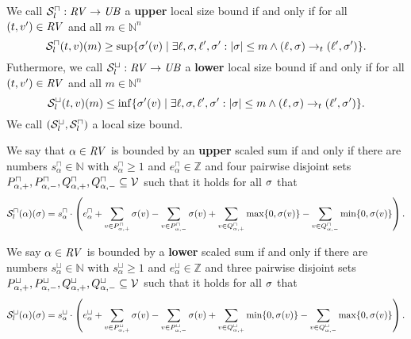 \begin{definition}
  We call ${\mathcal{S}^\sqcap_l}: \mathit{RV} \rightarrow \mathit{UB}$ a \textbf{upper} local size bound if and only if for all $(t, v') \in \mathit{RV}$ and all $m \in \mathbb{N}^n$
  \[ {\mathcal{S}^\sqcap_l}(t, v)(m) \geq \sup \lbrace \sigma'(v) \mid \exists \ell, \sigma, \ell', \sigma': \left|\sigma\right| \leq m \wedge (\ell_{}, \sigma_{}) \rightarrow_t (\ell', \sigma') \rbrace. \]
  Futhermore, we call ${\mathcal{S}^\sqcup_l}: \mathit{RV} \rightarrow \mathit{UB}$ a \textbf{lower} local size bound if and only if for all $(t, v') \in \mathit{RV}$ and all $m \in \mathbb{N}^n$
  \[ {\mathcal{S}^\sqcup_l}(t, v)(m) \leq \inf \lbrace \sigma'(v) \mid \exists \ell, \sigma, \ell', \sigma': \left|\sigma\right| \leq m \wedge (\ell_{}, \sigma_{}) \rightarrow_t (\ell', \sigma') \rbrace. \]
  We call ${({\mathcal{S}^\sqcup_l}, {\mathcal{S}^\sqcap_l})}$ a local size bound.
\end{definition}

\begin{definition}
  We say that $\alpha \in \mathit{RV}$ is bounded by an \textbf{upper} scaled sum if and only if there are numbers $s^\sqcap_\alpha \in \mathbb{N}$ with $s^\sqcap_\alpha \geq 1$ and $e^\sqcap_\alpha \in \mathbb{Z}$ and four pairwise disjoint sets $P_{\alpha,+}^\sqcap, P_{\alpha,-}^\sqcap, Q_{\alpha,+}^\sqcap, Q_{\alpha,-}^\sqcap \subseteq \mathcal{V}$ such that it holds for all $\sigma$ that
  \[ {\mathcal{S}^\sqcap_l}(\alpha)(\sigma) =
    s^\sqcap_\alpha \cdot \left(
        e^\sqcap_\alpha
      + \sum_{v \in P_{\alpha,+}^\sqcap} \sigma(v)
      - \sum_{v \in P_{\alpha,-}^\sqcap} \sigma(v)
      + \sum_{v \in Q_{\alpha,+}^\sqcap} \max \lbrace 0,\sigma(v) \rbrace
      - \sum_{v \in Q_{\alpha,-}^\sqcap} \min \lbrace 0,\sigma(v) \rbrace
    \right). \]

  We say $\alpha \in \mathit{RV}$ is bounded by a \textbf{lower} scaled sum if and only if there are numbers $s^\sqcup_\alpha \in \mathbb{N}$ with $s^\sqcup_\alpha \geq 1$ and $e^\sqcup_\alpha \in \mathbb{Z}$ and three pairwise disjoint sets $P_{\alpha,+}^\sqcup, P_{\alpha,-}^\sqcup, Q_{\alpha,+}^\sqcup, Q_{\alpha,-}^\sqcup \subseteq \mathcal{V}$ such that it holds for all $\sigma$ that
  \[ {\mathcal{S}^\sqcup_l}(\alpha)(\sigma) =
    s^\sqcup_\alpha \cdot \left(
      e^\sqcup_\alpha
    + \sum_{v \in P_{\alpha,+}^\sqcup} \sigma(v)
    - \sum_{v \in P_{\alpha,-}^\sqcup} \sigma(v)
    + \sum_{v \in Q_{\alpha,+}^\sqcup} \min \lbrace 0,\sigma(v) \rbrace
    - \sum_{v \in Q_{\alpha,-}^\sqcup} \max \lbrace 0,\sigma(v) \rbrace
  \right). \]
\end{definition}

